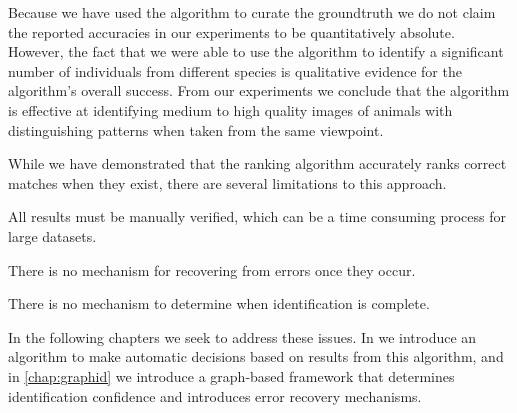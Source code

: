 
    Because we have used the algorithm to curate the groundtruth we do
      not claim the reported accuracies in our experiments to be
      quantitatively absolute.
    However, the fact that we were able to use the algorithm to
      identify a significant number of individuals from different species
      is qualitative evidence for the algorithm's overall success.
    From our experiments we conclude that the algorithm is effective at
      identifying medium to high quality images of animals with
      distinguishing patterns when taken from the same viewpoint.

    While we have demonstrated that the ranking algorithm accurately ranks
      correct matches when they exist, there are several limitations to this
      approach.
    \begin{itemln}
        \item All results must be manually verified, which can be a time
          consuming process for large datasets.
        \item There is no mechanism for recovering from errors once they
          occur.
        \item There is no mechanism to determine when identification is
          complete.
    \end{itemln}
    In the following chapters we seek to address these issues.
    In  we introduce an algorithm to make automatic
      decisions based on results from this algorithm, and in \cref{chap:graphid}
      we introduce a graph-based framework that determines identification
      confidence and introduces error recovery mechanisms.



